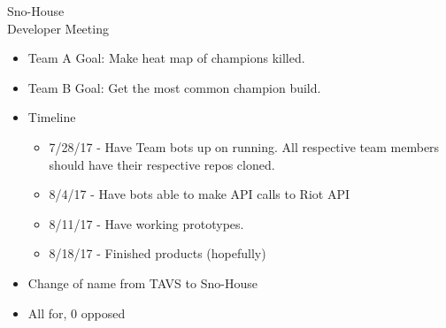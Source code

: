 \documentclass{article}
\begin{document}
\begin{Minutes}{Sno-House\\Developer Meeting}
\begin{itemize}
	\item Team A Goal: Make heat map of champions killed.
	\item Team B Goal: Get the most common champion build. 
	\item Timeline
	\begin{itemize}
		\item 7/28/17 - Have Team bots up on running. All respective team members should have their respective repos cloned.
		\item 8/4/17 - Have bots able to make API calls to Riot API
		\item 8/11/17 - Have working prototypes.
		\item 8/18/17 - Finished products (hopefully)
	\end{itemize}		
\end{itemize}

\begin{itemize}
	\item Change of name from TAVS to Sno-House
	\item All for, 0 opposed
\end{itemize}

\thispagestyle{creditfooter}

\end{Minutes}
\end{document}

